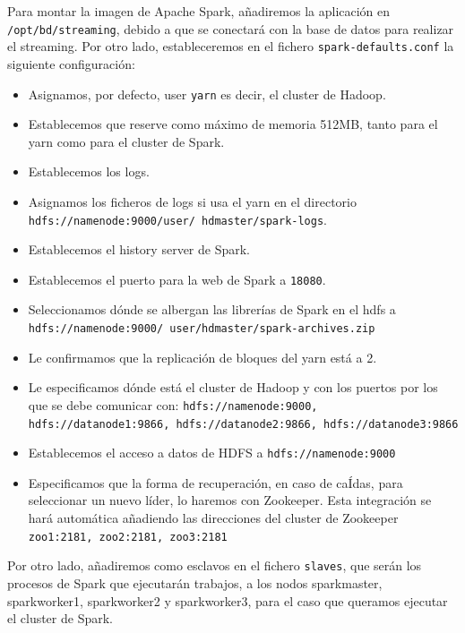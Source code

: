 Para montar la imagen de Apache Spark, añadiremos la aplicación en {\tt /opt/bd/streaming}, debido a que se conectará con la base de datos para realizar el streaming. Por otro lado, estableceremos en el fichero {\tt spark-defaults.conf} la siguiente configuración:
\begin{itemize}
        \item Asignamos, por defecto, user {\tt yarn} es decir, el cluster de Hadoop.
        \item Establecemos que reserve como máximo de memoria 512MB, tanto para el yarn como para el cluster de Spark.
        \item Establecemos los logs.
        \item Asignamos los ficheros de logs si usa el yarn en el directorio {\tt hdfs://namenode:9000/user/ hdmaster/spark-logs}.
        \item Establecemos el history server de Spark.
        \item Establecemos el puerto para la web de Spark a {\tt 18080}.
        \item Seleccionamos dónde se albergan las librerías de Spark en el hdfs a {\tt hdfs://namenode:9000/ user/hdmaster/spark-archives.zip}
        \item Le confirmamos que la replicación de bloques del yarn está a 2.
        \item Le especificamos dónde está el cluster de Hadoop y con los puertos por los que se debe comunicar con: {\tt hdfs://namenode:9000, hdfs://datanode1:9866, hdfs://datanode2:9866, hdfs://datanode3:9866}
        \item Establecemos el acceso a datos de HDFS a {\tt hdfs://namenode:9000}
        \item Especificamos que la forma de recuperación, en caso de caÍdas, para seleccionar un nuevo líder, lo haremos con Zookeeper. Esta integración se hará automática añadiendo las direcciones del cluster de Zookeeper {\tt zoo1:2181, zoo2:2181, zoo3:2181}
\end{itemize}

Por otro lado, añadiremos como esclavos en el fichero {\tt slaves}, que serán los procesos de Spark que ejecutarán trabajos, a los nodos sparkmaster, sparkworker1, sparkworker2 y sparkworker3, para el caso que queramos ejecutar el cluster de Spark.


